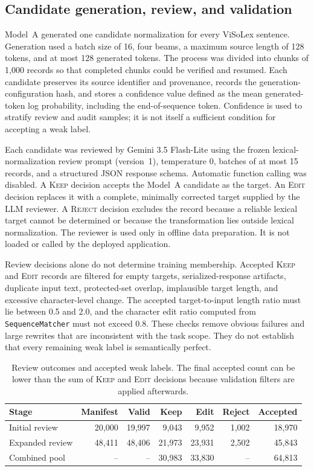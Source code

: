 \documentclass[11pt]{article}
\begin{document}
\subsection{Candidate generation, review, and validation}

Model~A generated one candidate normalization for every ViSoLex sentence. Generation used a batch size of 16, four beams, a maximum source length of 128 tokens, and at most 128 generated tokens. The process was divided into chunks of 1,000 records so that completed chunks could be verified and resumed. Each candidate preserves its source identifier and provenance, records the generation-configuration hash, and stores a confidence value defined as the mean generated-token log probability, including the end-of-sequence token. Confidence is used to stratify review and audit samples; it is not itself a sufficient condition for accepting a weak label.

Each candidate was reviewed by Gemini 3.5 Flash-Lite using the frozen lexical-normalization review prompt (version~1), temperature 0, batches of at most 15 records, and a structured JSON response schema. Automatic function calling was disabled. A \textsc{Keep} decision accepts the Model~A candidate as the target. An \textsc{Edit} decision replaces it with a complete, minimally corrected target supplied by the LLM reviewer. A \textsc{Reject} decision excludes the record because a reliable lexical target cannot be determined or because the transformation lies outside lexical normalization. The reviewer is used only in offline data preparation. It is not loaded or called by the deployed application.

Review decisions alone do not determine training membership. Accepted \textsc{Keep} and \textsc{Edit} records are filtered for empty targets, serialized-response artifacts, duplicate input text, protected-set overlap, implausible target length, and excessive character-level change. The accepted target-to-input length ratio must lie between 0.5 and 2.0, and the character edit ratio computed from \texttt{SequenceMatcher} must not exceed 0.8. These checks remove obvious failures and large rewrites that are inconsistent with the task scope. They do not establish that every remaining weak label is semantically perfect.

\begin{table}[t]
\centering
\caption{Review outcomes and accepted weak labels. The final accepted count can be lower than the sum of \textsc{Keep} and \textsc{Edit} decisions because validation filters are applied afterwards.}
\label{tab:weak-labels}
\begin{tabular}{lrrrrrr}
\toprule
Stage & Manifest & Valid & Keep & Edit & Reject & Accepted \\
\midrule
Initial review & 20,000 & 19,997 & 9,043 & 9,952 & 1,002 & 18,970 \\
Expanded review & 48,411 & 48,406 & 21,973 & 23,931 & 2,502 & 45,843 \\
Combined pool & -- & -- & 30,983 & 33,830 & -- & 64,813 \\
\bottomrule
\end{tabular}
\end{table}
\end{document}
